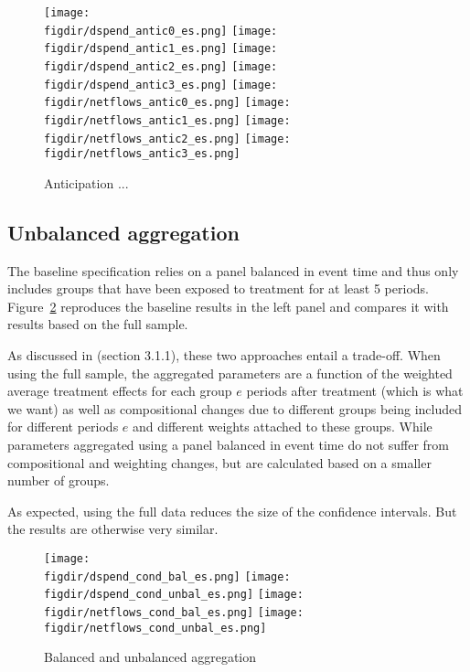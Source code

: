 \begin{figure}[H]
    \centering
    \caption{Anticipation ...}%
    \label{fig:new}
    \texttt{[image: \\figdir/dspend\_antic0\_es.png]}
    \texttt{[image: \\figdir/dspend\_antic1\_es.png]}
    \texttt{[image: \\figdir/dspend\_antic2\_es.png]}
    \texttt{[image: \\figdir/dspend\_antic3\_es.png]}
    \texttt{[image: \\figdir/netflows\_antic0\_es.png]}
    \texttt{[image: \\figdir/netflows\_antic1\_es.png]}
    \texttt{[image: \\figdir/netflows\_antic2\_es.png]}
    \texttt{[image: \\figdir/netflows\_antic3\_es.png]}
\end{figure}


\subsection{Unbalanced aggregation}%
\label{sub:unbalanced_aggregation}

The baseline specification relies on a panel balanced in event time and
thus only includes groups that have been exposed to treatment for at least 5
periods. Figure~\ref{fig:ub_comp} reproduces the baseline results in the left
panel and compares it with results based on the full sample.

As discussed in \citet{callaway2021difference} (section 3.1.1), these two
approaches entail a trade-off. When using the full sample, the aggregated
parameters are a function of the weighted average treatment effects for each
group $e$ periods after treatment (which is what we want) as well as
compositional changes due to different groups being included for different
periods $e$ and different weights attached to these groups. While parameters
aggregated using a panel balanced in event time do not suffer from
compositional and weighting changes, but are calculated based on a smaller
number of groups.

As expected, using the full data reduces the size of the confidence intervals.
But the results are otherwise very similar.

\begin{figure}[H]
    \centering
    \caption{Balanced and unbalanced aggregation}%
    \label{fig:ub_comp}
    \texttt{[image: \\figdir/dspend\_cond\_bal\_es.png]}
    \texttt{[image: \\figdir/dspend\_cond\_unbal\_es.png]}
    \texttt{[image: \\figdir/netflows\_cond\_bal\_es.png]}
    \texttt{[image: \\figdir/netflows\_cond\_unbal\_es.png]}
\end{figure}



